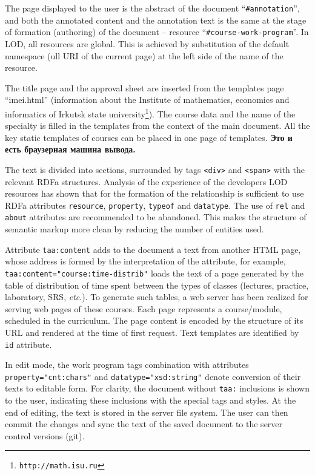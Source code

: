 \documentclass[conference,a4paper]{IEEEtran}
\providecommand\url[1]{\texttt{#1}}
\begin{document}
The page displayed to the user is the abstract of the document ``\texttt{\#annotation}'', and both the annotated content and the annotation text is the same at the stage of formation (authoring) of the document -- resource ``\texttt{\#course-work-program}''.  In LOD, all resources are global.  This is achieved by substitution of the default namespace (ull URI of the current page) at the left side of the name of the resource.

The title page and the approval sheet are inserted from the templates page ``imei.html'' (information about the Institute of mathematics, economics and informatics of Irkutsk state university\footnote{\url{http://math.isu.ru}}).  The course data and the name of the specialty is filled in the templates from the context of the main document.  All the key static templates of courses can be placed in one page of templates. \textbf{Это и есть браузерная машина вывода.}

The text is divided into sections, surrounded by tags \texttt{<div>} and \texttt{<span>} with the relevant RDFa structures.  Analysis of the experience of the developers LOD resources has shown that for the formation of the relationship is sufficient to use RDFa attributes \texttt{resource}, \texttt{property}, \texttt{typeof} and \texttt{datatype}.  The use of \texttt{rel} and \texttt{about} attributes are recommended to be abandoned.  This makes the structure of semantic markup more clean by reducing the number of entities used.

Attribute \texttt{taa:content} adds to the document a text from another HTML page, whose address is formed by the interpretation of the attribute, for example, \texttt{taa:content="course:time-distrib"} loads the text of a page generated by the table of distribution of time spent between the types of classes (lectures, practice, laboratory, SRS, \emph{etc}.).  To generate such tables, a web server has been realized for serving web pages of these courses. Each page represents a course/module, scheduled in the curriculum.  The page content is encoded by the structure of its URL and rendered at the time of first request.  Text templates are identified by \texttt{id} attribute.

In edit mode, the work program tags combination with attributes \texttt{property="cnt:chars"} and \texttt{datatype="xsd:string"} denote conversion of their texts to editable form.  For clarity, the document without \texttt{taa:} inclusions is shown to the user, indicating these inclusions with the special tags and styles.  At the end of editing, the text is stored in the server file system.  The user can then commit the changes and sync the text of the saved document to the server control versions (git).
\end{document}

